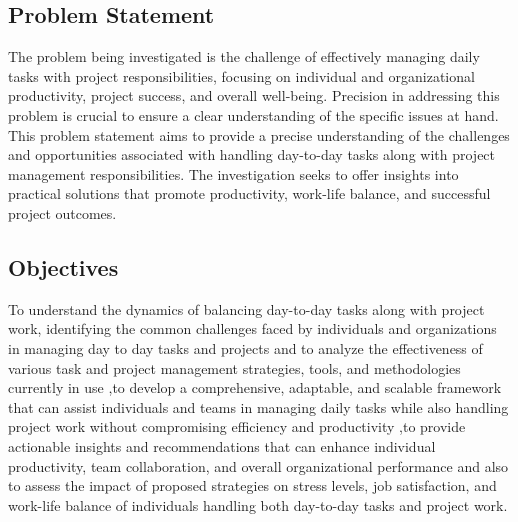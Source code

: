 \documentclass{chart}
\begin{document}
\subsection{Problem Statement} 
\hspace{1cm}The problem being investigated is the challenge of effectively managing daily tasks with project responsibilities, focusing on individual and organizational productivity, project success, and overall well-being. Precision in addressing this problem is crucial to ensure a clear understanding of the specific issues at hand. This problem statement aims to provide a precise understanding of the challenges and opportunities associated with handling day-to-day tasks along with project management responsibilities. The investigation seeks to offer insights into practical solutions that promote productivity, work-life balance, and successful project outcomes.

\subsection{Objectives} 
\hspace{1cm}To understand the dynamics of balancing day-to-day tasks along with project work, identifying the common challenges faced by individuals and organizations in managing day to day tasks and projects and to analyze the effectiveness of various task and project management strategies, tools, and methodologies currently in use ,to develop a comprehensive, adaptable, and scalable framework that can assist individuals and teams in managing daily tasks while also handling project work without compromising efficiency and productivity ,to provide actionable insights and recommendations that can enhance individual productivity, team collaboration, and overall organizational performance and also to assess the impact of proposed strategies on stress levels, job satisfaction, and work-life balance of individuals handling both day-to-day tasks and project work.
\newpage
 \vspace*{0.5cm}
\end{document}
